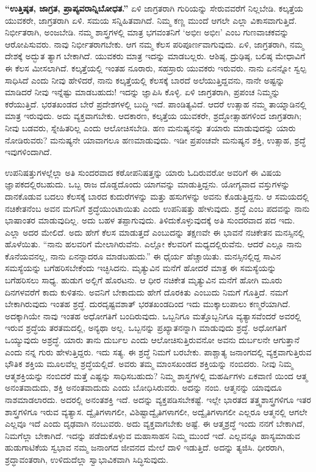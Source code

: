 \textbf{“ಉತ್ತಿಷ್ಠತ, ಜಾಗ್ರತ, ಪ್ರಾಪ್ಯವರಾನ್ನಿಬೋಧತ.”} ಏಳಿ ಜಾಗ್ರತರಾಗಿ ಗುರಿಯನ್ನು ಸೇರುವವರೆಗೆ ನಿಲ್ಲಬೇಡಿ. ಕಲ್ಕತ್ತೆಯ ಯುವಕರೇ, ಜಾಗ್ರತರಾಗಿ ಏಳಿ. ಸಮಯ ಸನ್ನಿಹಿತವಾಗಿದೆ. ನಿಮ್ಮ ಕಣ್ಣ ಮುಂದೆ ಆಗಲೇ ಎಲ್ಲಾ ವಿಕಾಸವಾಗುತ್ತಿದೆ. ನಿರ್ಭೀತರಾಗಿ, ಅಂಜಬೇಡಿ. ನಮ್ಮ ಶಾಸ್ತ್ರಗಳಲ್ಲಿ ಮಾತ್ರ ಭಗವಂತನಿಗೆ ‘ಅಭೀಃ ಅಭೀಃ’ ಎಂಬ ಗುಣವಾಚಕವನ್ನು ಆರೋಪಿಸುವರು. ನಾವು ನಿರ್ಭೀತರಾಗಬೇಕು. ಆಗ ನಮ್ಮ ಕೆಲಸ ಪರಿಪೂರ್ಣವಾಗುವುದು. ಏಳಿ, ಜಾಗ್ರತರಾಗಿ, ನಮ್ಮ ದೇಶಕ್ಕೆ ಅದ್ಭುತ ತ್ಯಾಗ ಬೇಕಾಗಿದೆ. ಯುವಕರು ಮಾತ್ರ ಇದನ್ನು ಮಾಡಬಲ್ಲರು. ಆಶಿಷ್ಠ, ದ್ರುಢಿಷ್ಠ, ಬಲಿಷ್ಠ ಮೇಧಾವಿಗೆ ಈ ಕೆಲಸ ಮೀಸಲಾಗಿದೆ. ಕಲ್ಕತ್ತೆಯಲ್ಲಿ ಇಂತಹ ನೂರಾರು, ಸಹಸ್ರಾರು ಯುವಕರು ಇರುವರು. ನಾನು ಏನನ್ನೋ ಸ್ವಲ್ಪ ಸಾಧಿಸಿದೆ ಎಂದು ನೀವು ಹೇಳಿದರೆ, ನಾನು ಕಲ್ಕತ್ತೆಯಲ್ಲಿ ಕೆಲಸಕ್ಕೆ ಬಾರದೆ ಅಲೆಯುತ್ತಿದ್ದವನು, ನಾನೇ ಅಷ್ಟನ್ನು ಮಾಡಿದರೆ ನೀವು ಇನ್ನೆಷ್ಟು ಮಾಡಬಹುದು! ಇದನ್ನು ಜ್ಞಾಪಿಸಿ ಕೊಳ್ಳಿ. ಏಳಿ ಜಾಗ್ರತರಾಗಿ, ಪ್ರಪಂಚ ನಿಮ್ಮನ್ನು ಕರೆಯುತ್ತಿದೆ. ಭರತಖಂಡದ ಬೇರೆ ಪ್ರದೇಶಗಳಲ್ಲಿ ಬುದ್ಧಿ ಇದೆ. ಪಾಂಡಿತ್ಯವಿದೆ. ಆದರೆ ಉತ್ಸಾಹ ನಮ್ಮ ತಾಯ್ನಾಡಿನಲ್ಲಿ ಮಾತ್ರ ಇರುವುದು. ಅದು ವ್ಯಕ್ತವಾಗಬೇಕು. ಆದಕಾರಣ, ಕಲ್ಕತ್ತೆಯ ಯುವಕರೇ, ಶ್ರದ್ಧೋತ್ಸಾಹಗಳಿಂದ ಜಾಗ್ರತರಾಗಿ; ನೀವು ಬಡವರು, ಸ್ನೇಹಿತರಿಲ್ಲ ಎಂದು ಆಲೋಚಿಸಬೇಡಿ. ಹಣ ಮನುಷ್ಯನನ್ನು ತಯಾರು ಮಾಡುವುದನ್ನು ಯಾರು ನೋಡಿರುವರು? ಮನುಷ್ಯನೇ ಯಾವಾಗಲೂ ಹಣಮಾಡುವುದು. ಇಡೀ ಪ್ರಪಂಚವೇ ಮನುಷ್ಯನ ಶಕ್ತಿ, ಉತ್ಸಾಹ, ಶ್ರದ್ಧೆ ಇವುಗಳಿಂದಾಗಿದೆ.

ಉಪನಿಷತ್ತುಗಳಲ್ಲೆಲ್ಲಾ ಅತಿ ಸುಂದರವಾದ ಕಠೋಪನಿಷತ್ತನ್ನು ಯಾರು ಓದಿರುವರೋ ಅವರಿಗೆ ಈ ವಿಷಯ ಜ್ಞಾಪಕದಲ್ಲಿರಬಹುದು. ಒಬ್ಬ ರಾಜ ದೊಡ್ಡದೊಂದು ಯಾಗವನ್ನು ಮಾಡುತ್ತಿದ್ದನು. ಯೋಗ್ಯವಾದ ವಸ್ತುಗಳನ್ನು ದಾನಕೊಡುವ ಬದಲು ಕೆಲಸಕ್ಕೆ ಬಾರದ ಕುದುರೆಗಳನ್ನು ಮತ್ತು ಹಸುಗಳನ್ನು ಅವನು ಕೊಡುತ್ತಿದ್ದನು. ಆ ಸಮಯದಲ್ಲಿ ನಚಿಕೇತನೆಂಬ ಅವನ ಮಗನಿಗೆ ಶ್ರದ್ಧೆಯುಂಟಾಯಿತು ಎಂದು ಉಪನಿಷತ್ತು ಹೇಳುವುದು. ಶ್ರದ್ಧೆ ಎಂಬ ಪದವನ್ನು ನಾನು ಭಾಷಾಂತರ ಮಾಡುವುದಿಲ್ಲ. ಅದು ಬಹಳ ತಪ್ಪಾಗುವುದು. ತಿಳಿದುಕೊಳ್ಳುವುದಕ್ಕೆ ಅತಿ ಸುಂದರವಾದ ಪದ ಇದು. ಎಲ್ಲಾ ಅದರ ಮೇಲಿದೆ. ಅದು ಹೇಗೆ ಕೆಲಸ ಮಾಡುತ್ತದೆ ಎಂಬುದನ್ನು ತಕ್ಷಣವೇ ಈ ಭಾವನೆ ನಚಿಕೇತನ ಮನಸ್ಸಿನಲ್ಲಿ ಹೊಳೆಯಿತು. “ನಾನು ಹಲವರಿಗೆ ಮೇಲಾಗಿರುವೆನು. ಎಲ್ಲೋ ಕೆಲವರಿಗೆ ಮಧ್ಯದಲ್ಲಿರುವೆನು. ಆದರೆ ಎಲ್ಲೂ ನಾನು ಕೊನೆಯವನಲ್ಲ, ನಾನು ಏನನ್ನಾದರೂ ಮಾಡಬಹುದು.” ಈ ಧೈರ್ಯ ಹೆಚ್ಚಾಯಿತು. ಮನಸ್ಸಿನಲ್ಲಿದ್ದ ಸಾವಿನ ಸಮಸ್ಯೆಯನ್ನು ಬಗೆಹರಿಸಬೇಕೆಂದು ಇಚ್ಛಿಸಿದನು. ಮೃತ್ಯುವಿನ ಮನೆಗೆ ಹೋದರೆ ಮಾತ್ರ ಈ ಸಮಸ್ಯೆಯನ್ನು ಬಗೆಹರಿಸಲು ಸಾಧ್ಯ. ಹುಡುಗ ಅಲ್ಲಿಗೆ ಹೊರಟನು. ಆ ಧೀರ ನಚಿಕೇತ ಮೃತ್ಯುವಿನ ಮನೆಗೆ ಹೋಗಿ ಮೂರು ದಿನಗಳವರೆಗೆ ಕಾದು ಕುಳಿತನು. ಅವನಿಗೆ ಬೇಕಾದುದು ಹೇಗೆ ದೊರಕಿತು ಎಂಬುದು ನಿಮಗೆ ಗೊತ್ತಿದೆ. ನಮಗೆ ಬೇಕಾಗಿರುವುದು ಇಂತಹ ಶ್ರದ್ಧೆ. ದುರದೃಷ್ಟವಶಾತ್​ ಭರತಖಂಡದಿಂದ ಇದು ಮುಕ್ಕಾಲುಪಾಲು ಕಣ್ಮರೆಯಾಗಿದೆ. ಅದಕ್ಕಾಗಿಯೇ ನಾವು ಇಂತಹ ಅಧೋಗತಿಗೆ ಬಂದಿರುವುದು. ಒಬ್ಬನಿಗೂ ಮತ್ತೊಬ್ಬನಿಗೂ ವ್ಯತ್ಯಾಸವೆಂದರೆ ಅವರಲ್ಲಿ ಇರುವ ಶ್ರದ್ಧೆಯ ತರತಮದಲ್ಲಿ, ಅನ್ಯಥಾ ಅಲ್ಲ. ಒಬ್ಬನನ್ನು ಪ್ರಖ್ಯಾತನನ್ನಾಗಿ ಮಾಡುವುದು ಶ್ರದ್ಧೆ. ಅಧೋಗತಿಗೆ ಒಯ್ಯುವುದು ಅಶ್ರದ್ಧೆ. ಯಾರು ತಾನು ದುರ್ಬಲ ಎಂದು ಆಲೋಚಿಸುತ್ತಿರುವನೋ ಅವನು ದುರ್ಬಲನೇ ಆಗುತ್ತಾನೆ ಎಂದು ನನ್ನ ಗುರು ಹೇಳುತ್ತಿದ್ದರು. ಇದು ಸತ್ಯ. ಈ ಶ್ರದ್ಧೆ ನಿಮಗೆ ಬರಬೇಕು. ಪಾಶ್ಚಾತ್ಯ ಜನಾಂಗದಲ್ಲಿ ವ್ಯಕ್ತವಾಗುತ್ತಿರುವ ಭೌತಿಕ ಶಕ್ತಿಯ ಮೂಲವೆಲ್ಲ ಶ್ರದ್ಧೆಯಲ್ಲಿದೆ. ಅವರು ತಮ್ಮ ಮಾಂಸಖಂಡದ ಶಕ್ತಿಯನ್ನು ನಂಬಿದರು. ನೀವು ನಿಮ್ಮ ಆತ್ಮಶಕ್ತಿಯನ್ನು ನಂಬಿದರೆ ಮತ್ತೆ ಎಷ್ಟನ್ನು ಸಾಧಿಸಬಹುದು? ನಿಮ್ಮ ಶಾಸ್ತ್ರಗಳಲ್ಲಿ ಮಹರ್ಷಿಗಳು ಏಕವಾಣಿ ಯಿಂದ ಆತ್ಮ ಅನಂತವಾದುದು, ಶಕ್ತಿ ಅನಂತವಾದುದು ಎಂದು ಬೋಧಿಸಿರುವರು. ಅದನ್ನು ನಂಬಿ. ಆತ್ಮನನ್ನು ಯಾವುದೂ ನಾಶಮಾಡಲಾರದು. ಅದರಲ್ಲಿ ಅನಂತಶಕ್ತಿ ಇದೆ. ಅದನ್ನು ವ್ಯಕ್ತಪಡಿಸಬೇಕಷ್ಟೆ. ಇಲ್ಲೇ ಭಾರತದ ತತ್ತ್ವಶಾಸ್ತ್ರಗಳಿಗೂ ಇತರ ಶಾಸ್ತ್ರಗಳಿಗೂ ಇರುವ ವ್ಯತ್ಯಾಸ. ದ್ವೈತಿಗಳಾಗಲೀ, ವಿಶಿಷ್ಟಾದ್ವೈತಿಗಳಾಗಲೀ, ಅದ್ವೈತಿಗಳಾಗಲೀ ಎಲ್ಲರೂ ಆತ್ಮನಲ್ಲಿ ಆಗಲೇ ಎಲ್ಲವೂ ಇದೆ ಎಂದು ದೃಢವಾಗಿ ನಂಬುವರು. ಅದು ವ್ಯಕ್ತವಾಗಬೇಕು ಅಷ್ಟೆ. ಈ ಆತ್ಮಶ್ರದ್ಧೆ ಇಂದು ನನಗೆ ಬೇಕಾಗಿದೆ, ನಿಮಗೆಲ್ಲಾ ಬೇಕಾಗಿದೆ. ಇದನ್ನು ಪಡೆದುಕೊಳ್ಳುವ ಮಹಾಸಾಹಸ ನಿಮ್ಮ ಮುಂದೆ ಇದೆ. ಎಲ್ಲವನ್ನೂ ಹಾಸ್ಯಮಾಡುವ ಹುಡುಗಾಟಿಕೆಯ ಸ್ವಭಾವ ನಮ್ಮ ಜನಾಂಗದ ಜೀವನದ ಮೇಲೆ ದಾಳಿ ಇಡುತ್ತಿದೆ. ಅದನ್ನು ತ್ಯಜಿಸಿ. ಧೀರರಾಗಿ, ಶ್ರದ್ಧಾವಂತರಾಗಿ, ಉಳಿದುದೆಲ್ಲಾ ಸ್ವಾಭಾವಿಕವಾಗಿ ಸಿದ್ಧಿಸುವುದು.

